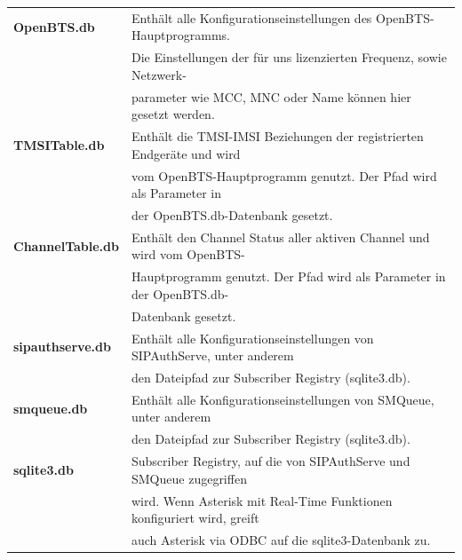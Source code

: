\begin{table}[h]
	\centering
		\begin{tabular}{ll}
			\textbf{OpenBTS.db} & Enthält alle Konfigurationseinstellungen des OpenBTS-Hauptprogramms.\\
			& Die Einstellungen der für uns lizenzierten Frequenz, sowie Netzwerk-\\
			& parameter wie MCC, MNC oder Name können hier gesetzt werden.\\
			\textbf{TMSITable.db} & Enthält die TMSI-IMSI Beziehungen der registrierten Endgeräte und wird\\
			& vom OpenBTS-Hauptprogramm genutzt. Der Pfad wird als Parameter in\\
			& der OpenBTS.db-Datenbank gesetzt.\\
			\textbf{ChannelTable.db} & Enthält den Channel Status aller aktiven Channel und wird vom OpenBTS-\\
			& Hauptprogramm genutzt. Der Pfad wird als Parameter in der OpenBTS.db-\\
			& Datenbank gesetzt.\\
			\textbf{sipauthserve.db} & Enthält alle Konfigurationseinstellungen von SIPAuthServe, unter anderem\\
			& den Dateipfad zur Subscriber Registry (sqlite3.db).\\
			\textbf{smqueue.db} & Enthält alle Konfigurationseinstellungen von SMQueue, unter anderem\\
			& den Dateipfad zur Subscriber Registry (sqlite3.db).\\
			\textbf{sqlite3.db} & Subscriber Registry, auf die von SIPAuthServe und SMQueue zugegriffen\\
			& wird. Wenn Asterisk mit Real-Time Funktionen konfiguriert wird, greift\\
			& auch Asterisk via ODBC auf die sqlite3-Datenbank zu.\\
		\end{tabular}
\end{table}

